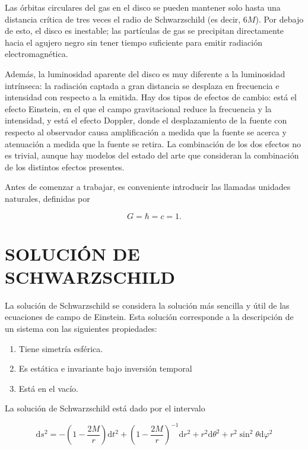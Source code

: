 \documentclass[11pt]{article}
\begin{document}
Las órbitas circulares del gas en el disco se pueden mantener solo hasta una distancia crítica de tres veces el radio de Schwarzschild (es decir, $6M$). Por debajo de esto, el disco es inestable; las partículas de gas se precipitan directamente hacia el agujero negro sin tener tiempo suficiente para emitir radiación electromagnética. \medskip

Además, la luminosidad aparente del disco es muy diferente a la luminosidad intrínseca: la radiación captada a gran distancia se desplaza en frecuencia e intensidad con respecto a la emitida. Hay dos tipos de efectos de cambio: está el efecto Einstein, en el que el campo gravitacional reduce la frecuencia y la intensidad, y está el efecto Doppler, donde el desplazamiento de la fuente con respecto al observador causa amplificación a medida que la fuente se acerca y atenuación a medida que la fuente se retira. La combinación de los dos efectos no es trivial, aunque hay modelos del estado del arte que consideran la combinación de los distintos efectos presentes.

\newpage

Antes de comenzar a trabajar, es conveniente introducir las llamadas unidades naturales, definidas por

\begin{equation}
G = \hbar = c = 1.
\label{ec:unidades naturales}
\end{equation}


\section{SOLUCIÓN DE SCHWARZSCHILD}

La solución de Schwarzschild se considera la solución más sencilla y útil de las ecuaciones de campo de Einstein. Esta solución corresponde a la descripción de un sistema con las siguientes propiedades: \cite{Luminet_1979} \cite{Amarilla_2012} \cite{Amarilla_2018}

\begin{enumerate}
\item Tiene simetría esférica.
\item Es estática e invariante bajo inversión temporal
\item Está en el vacío. 
\end{enumerate}

La solución de Schwarzschild está dado por el intervalo

\begin{equation}
\text{d}s^{2} = -\left( 1 - \dfrac{2M}{r} \right)\text{d}t^{2} + \left( 1 - \dfrac{2M}{r} \right)^{-1}\text{d}r^{2}
+ r^{2}\text{d}\theta^{2} + r^{2}\sin^{2}\theta\text{d}\varphi^{2}
\label{ec:intervalo Schwarzschild}
\end{equation}
\end{document}
